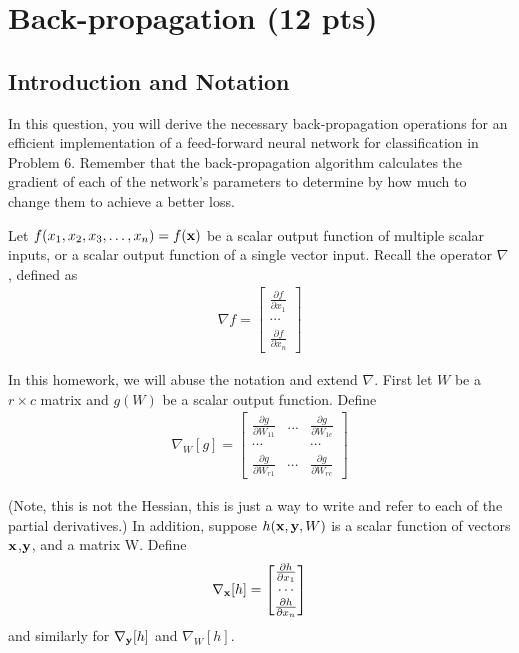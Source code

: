 \section{Back-propagation (12 pts)}

\subsection*{Introduction and Notation}

In this question, you will derive the necessary back-propagation operations for an efficient implementation of a feed-forward neural network for classification in Problem 6. Remember that the back-propagation algorithm calculates the gradient of each of the network's parameters to determine by how much to change them to achieve a better loss.\par

Let $f(x_1,x_2,x_3,\dots,x_n)=f({\bf{x}})$ be a scalar output function of multiple scalar inputs, or a scalar output function of a single vector input. Recall the operator $\nabla$, defined as 
\begin{align}
    \nabla f = 
    \begin{bmatrix}
        \frac{\partial f}{\partial x_1}\\
        \cdots \\
        \frac{\partial f}{\partial x_n}
    \end{bmatrix}
\end{align}

In this homework, we will abuse the notation and extend $\nabla$. First let $W$ be a $r\times c$ matrix and $g(W)$ be a scalar output function. Define
\begin{align}
    \nabla_W [g] = 
    \begin{bmatrix}
        \frac{\partial g}{\partial W_{11}} & ... & \frac{\partial g}{\partial W_{1c}}\\
        \cdots & & \cdots\\
        \frac{\partial g}{\partial W_{r1}} & \cdots & \frac{\partial g}{\partial W_{rc}}
    \end{bmatrix}
\end{align}

(Note, this is not the Hessian, this is just a way to write and refer to each of the partial derivatives.) In addition, suppose $h({\bf{x}},{\bf{y}},W)$ is a scalar function of vectors ${\bf{x}}$,${\bf{y}}$, and a matrix W. Define 
\begin{align}
    \nabla_{\bf{x}} [h] = 
    \begin{bmatrix}
        \frac{\partial h}{\partial x_1}\\
        \cdots \\
        \frac{\partial h}{\partial x_n}
    \end{bmatrix}
\end{align}
and similarly for $\nabla_{\bf{y}} [h]$ and $\nabla_W [h]$.

